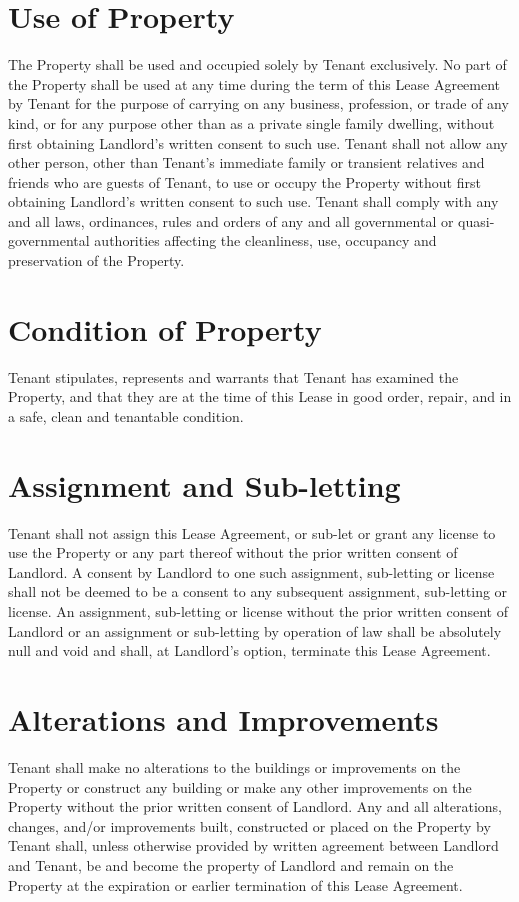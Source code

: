 \documentclass{amsart}
\begin{document}
\section{Use of Property}
The Property shall be used and occupied solely by Tenant exclusively.  No part
of the Property shall be used at any time during the term of this Lease
Agreement by Tenant for the purpose of carrying on any business, profession, or
trade of any kind, or for any purpose other than as a private single family
dwelling, without first obtaining Landlord's written consent to such use.
Tenant shall not allow any other person, other than Tenant's immediate family or
transient relatives and friends who are guests of Tenant, to use or occupy the
Property without first obtaining Landlord's written consent to such use. Tenant
shall comply with any and all laws, ordinances, rules and orders of any and all
governmental or quasi-governmental authorities affecting the cleanliness, use,
occupancy and preservation of the Property.
\section{Condition of Property}
Tenant stipulates, represents and warrants that Tenant has examined the
Property, and that they are at the time of this Lease in good order, repair, and
in a safe, clean and tenantable condition.
\section{Assignment and Sub-letting}
Tenant shall not assign this Lease Agreement, or sub-let or grant any license to
use the Property or any part thereof without the prior written consent of
Landlord. A consent by Landlord to one such assignment, sub-letting or license
shall not be deemed to be a consent to any subsequent assignment, sub-letting or
license. An assignment, sub-letting or license without the prior written consent
of Landlord or an assignment or sub-letting by operation of law shall be
absolutely null and void and shall, at Landlord's option, terminate this Lease
Agreement.
\section{Alterations and Improvements}
Tenant shall make no alterations to the buildings or improvements on the
Property or construct any building or make any other improvements on the
Property without the prior written consent of Landlord. Any and all alterations,
changes, and/or improvements built, constructed or placed on the Property by
Tenant shall, unless otherwise provided by written agreement between Landlord
and Tenant, be and become the property of Landlord and remain on the Property at
the expiration or earlier termination of this Lease Agreement.
\end{document}

